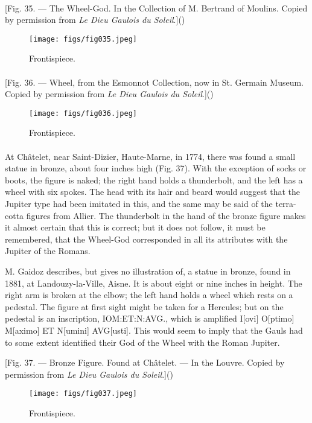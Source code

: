 \documentclass[a4paper, 11pt, oneside, polutonikogreek, english]{article}
\begin{document}
\paragraph{}
[Fig. 35. --- The Wheel-God. In the Collection of M. Bertrand of Moulins. Copied by permission from \emph{Le Dieu Gaulois du Soleil}.]()
\begin{figure}[H]
\centering
\texttt{[image: figs/fig035.jpeg]}
\caption{Frontispiece.}
\end{figure}
\paragraph{}
[Fig. 36. --- Wheel, from the Esmonnot Collection, now in St. Germain Museum. Copied by permission from \emph{Le Dieu Gaulois du Soleil}.]()
\begin{figure}[H]
\centering
\texttt{[image: figs/fig036.jpeg]}
\caption{Frontispiece.}
\end{figure}
\paragraph{}
At Châtelet, near Saint-Dizier, Haute-Marne, in 1774, there was found a small statue in bronze, about four inches high (Fig. 37). With the exception of socks or boots, the figure is naked; the right hand holds a thunderbolt, and the left has a wheel with six spokes. The head with its hair and beard would suggest that the Jupiter type had been imitated in this, and the same may be said of the terra-cotta figures from Allier. The thunderbolt in the hand of the bronze figure makes it almost certain that this is correct; but it does not follow, it must be remembered, that the Wheel-God corresponded in all its attributes with the Jupiter of the Romans.

M. Gaidoz describes, but gives no illustration of, a statue in bronze, found in 1881, at Landouzy-la-Ville, Aisne. It is about eight or nine inches in height. The right arm is broken at the elbow; the left hand holds a wheel which rests on a pedestal. The figure at first sight might be taken for a Hercules; but on the pedestal is an inscription, IOM:ET:N:AVG., which is amplified I[ovi] O[ptimo] M[aximo] ET N[umini] AVG[usti]. This would seem to imply that the Gauls had to some extent identified their God of the Wheel with the Roman Jupiter.

[Fig. 37. --- Bronze Figure. Found at Châtelet. --- In the Louvre. Copied by permission from \emph{Le Dieu Gaulois du Soleil}.]()
\begin{figure}[H]
\centering
\texttt{[image: figs/fig037.jpeg]}
\caption{Frontispiece.}
\end{figure}
\end{document}
